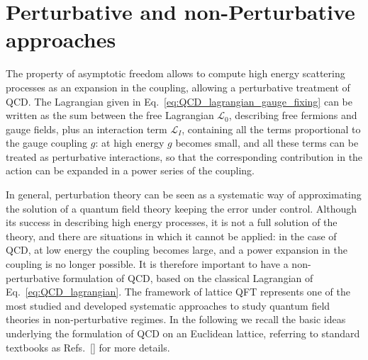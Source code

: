 \section{Perturbative and non-Perturbative approaches}
The property of asymptotic freedom allows to compute high energy scattering processes as
an expansion in the coupling, allowing a perturbative treatment of QCD.
The Lagrangian given in Eq.~\ref{eq:QCD_lagrangian_gauge_fixing}
can be written as the sum between the free Lagrangian $\mathcal{L}_0$, describing free fermions and gauge fields, 
plus an interaction term $\mathcal{L}_I$, containing all the terms proportional to the gauge coupling $g$:
at high energy $g$ becomes small, and all these terms 
can be treated as perturbative interactions, so that the corresponding
contribution in the action can be expanded in a power series of the coupling.

%
In general, perturbation theory can be seen as a systematic way of approximating the solution 
of a quantum field theory keeping the error under control.
Although its success in describing high energy processes, it is not a full solution of the theory, 
and there are situations in which it cannot be applied: in the case of QCD, at low energy the coupling
becomes large, and a power expansion in the coupling is no longer possible. 
It is therefore important to have a non-perturbative formulation of QCD, based on the classical Lagrangian 
of Eq.~\ref{eq:QCD_lagrangian}.
The framework of lattice QFT represents one of the most studied and developed systematic approaches to study quantum
field theories in non-perturbative regimes. In the following we recall the basic ideas underlying the formulation of 
QCD on an Euclidean lattice, referring to standard textbooks as Refs.~[] for more details.

